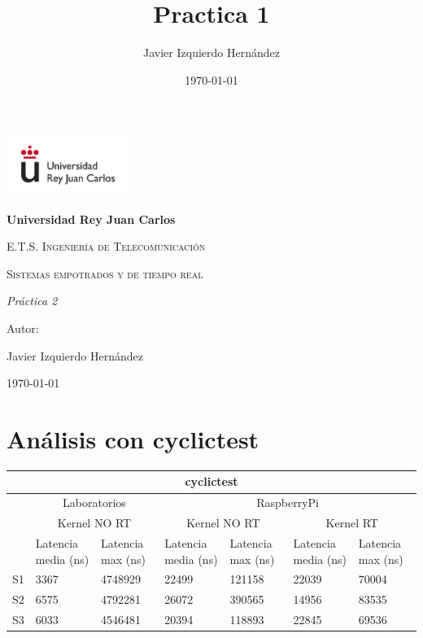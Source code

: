 \documentclass[12pt, a4paper]{report}
\title{Practica 1}
\author{Javier Izquierdo Hernández}
\date{\today}
\begin{document}
	\begin{titlepage}
		\centering
		{\includegraphics[width=0.3\textwidth]{logo}\par}
		\vspace{1cm}
		{\bfseries\LARGE Universidad Rey Juan Carlos \par}
		\vspace{1cm}
		{\scshape\Large E.T.S. Ingeniería de Telecomunicación \par}
		\vspace{3cm}
		{\scshape\Huge Sistemas empotrados y de tiempo real \par}
		\vspace{3cm}
		{\itshape\Large Práctica 2 \par}
		\vfill
		{\Large Autor: \par}
		{\Large Javier Izquierdo Hernández \par}
		\vfill
		{\Large \today \par}
	\end{titlepage}
	
	\newpage
	\chapter*{Análisis con cyclictest}
	\begin{center}
		\setlength\extrarowheight{4pt}
		\begin{tabular}{ |p{1cm}|p{2cm}|p{2cm}|p{2cm}|p{2cm}|p{2cm}|p{2cm}| } 
			\hline
			\multicolumn{7}{|c|}{\textbf{cyclictest}}\\ 
			\hline
			& \multicolumn{2}{|c|}{Laboratorios} & \multicolumn{4}{|c|}{RaspberryPi}\\ 
			\cline{2-7}
		 	& \multicolumn{2}{|c|}{Kernel NO RT} & \multicolumn{2}{|c|}{Kernel NO RT} & \multicolumn{2}{|c|}{Kernel RT}\\ 
			\cline{2-7}
		 	 & Latencia media (ns) & Latencia max (ns)& Latencia media (ns) & Latencia max (ns)& Latencia media (ns) & Latencia max (ns)\\ 
			\hline
		 	 S1 & 3367 & 4748929& 22499& 121158& 22039&70004\\ 
			\hline
		 	 S2 & 6575 & 4792281& 26072& 390565& 14956&83535\\ 
			\hline
		 	 S3 & 6033 & 4546481& 20394& 118893& 22845&69536\\ 
			\hline
		\end{tabular}
	\end{center}
\end{document}
